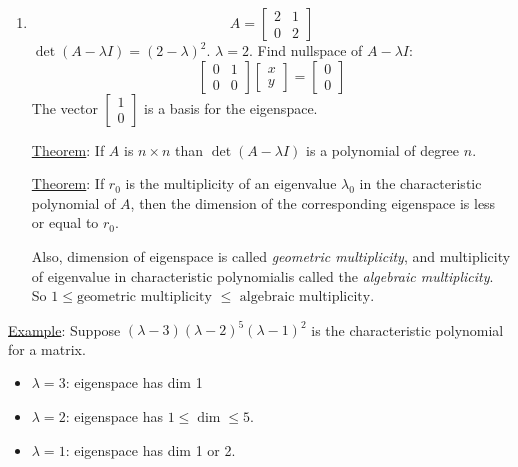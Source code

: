 \documentclass{article}
\newcommand{\tmem}[1]{{\em #1\/}}
\begin{document}
\begin{enumerate}
  \item
  \[ A = \left[\begin{array}{cc}
       2 & 1\\
       0 & 2
     \end{array}\right] \]
  $\det (A - \lambda I) = (2 - \lambda)^2$. $\lambda = 2$. Find nullspace of
  $A - \lambda I$:
  \[ \left[\begin{array}{cc}
       0 & 1\\
       0 & 0
     \end{array}\right]  \left[\begin{array}{c}
       x\\
       y
     \end{array}\right] = \left[\begin{array}{c}
       0\\
       0
     \end{array}\right] \]
  The vector $\left[\begin{array}{c}
    1\\
    0
  \end{array}\right]$ is a basis for the eigenspace.
  
  {\underline{Theorem}}: If $A$ is $n \times n$ than $\det (A - \lambda I)$ is
  a polynomial of degree $n$.
  
  {\underline{Theorem}}: If $r_0$ is the multiplicity of an eigenvalue
  $\lambda_0$ in the characteristic polynomial of $A$, then the dimension of
  the corresponding eigenspace is less or equal to $r_0$.
  
  Also, dimension of eigenspace is called {\tmem{geometric multiplicity}},
  and multiplicity of eigenvalue in characteristic polynomial\quad is called
  the {\tmem{algebraic multiplicity}}. So $1 \leq \text{geometric multiplicity
  } \leq \text{ algebraic multiplicity}$.
\end{enumerate}
{\underline{Example}}: Suppose $(\lambda - 3)  (\lambda - 2)^5  (\lambda -
1)^2$ is the characteristic polynomial for a matrix.
\begin{itemize}
  \item $\lambda = 3$: eigenspace has dim 1
  
  \item $\lambda = 2$: eigenspace has $1 \leq \dim \leq 5$.
  
  \item $\lambda = 1$: eigenspace has dim 1 or 2.
\end{itemize}
\end{document}
